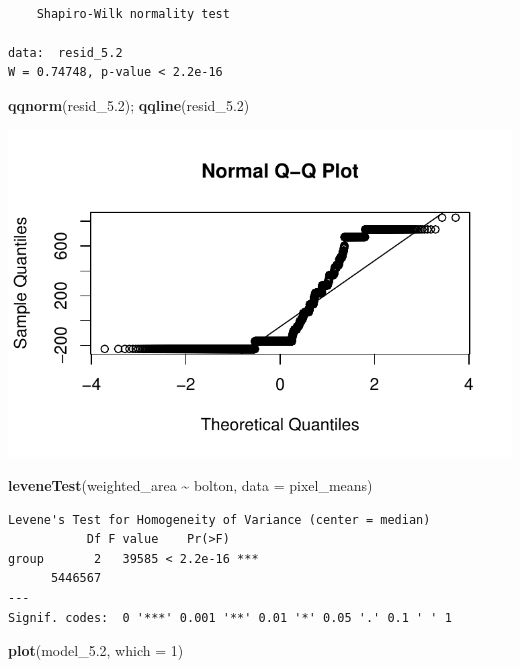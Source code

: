 \documentclass[
  british,
  10pt,
]{article}
\newenvironment{Shaded}{\begin{snugshade}}{\end{snugshade}}
\newcommand{\AttributeTok}[1]{\textcolor[rgb]{0.13,0.29,0.53}{#1}}
\newcommand{\DecValTok}[1]{\textcolor[rgb]{0.00,0.00,0.81}{#1}}
\newcommand{\FloatTok}[1]{\textcolor[rgb]{0.00,0.00,0.81}{#1}}
\newcommand{\FunctionTok}[1]{\textcolor[rgb]{0.13,0.29,0.53}{\textbf{#1}}}
\newcommand{\NormalTok}[1]{#1}
\newcommand{\SpecialCharTok}[1]{\textcolor[rgb]{0.81,0.36,0.00}{\textbf{#1}}}
\begin{document}
\begin{verbatim}

    Shapiro-Wilk normality test

data:  resid_5.2
W = 0.74748, p-value < 2.2e-16
\end{verbatim}

\begin{Shaded}
\begin{Highlighting}[]
\FunctionTok{qqnorm}\NormalTok{(resid\_5}\FloatTok{.2}\NormalTok{); }\FunctionTok{qqline}\NormalTok{(resid\_5}\FloatTok{.2}\NormalTok{)}
\end{Highlighting}
\end{Shaded}

\begin{center}
\includegraphics[width=0.6\linewidth,height=\textheight,keepaspectratio]{BCB744_Biostats_Prac_Exam_2025_files/figure-pdf/chunk18-1.pdf}
\end{center}

\begin{Shaded}
\begin{Highlighting}[]
\FunctionTok{leveneTest}\NormalTok{(weighted\_area }\SpecialCharTok{\textasciitilde{}}\NormalTok{ bolton, }\AttributeTok{data =}\NormalTok{ pixel\_means)}
\end{Highlighting}
\end{Shaded}

\begin{verbatim}
Levene's Test for Homogeneity of Variance (center = median)
           Df F value    Pr(>F)    
group       2   39585 < 2.2e-16 ***
      5446567                      
---
Signif. codes:  0 '***' 0.001 '**' 0.01 '*' 0.05 '.' 0.1 ' ' 1
\end{verbatim}

\begin{Shaded}
\begin{Highlighting}[]
\FunctionTok{plot}\NormalTok{(model\_5}\FloatTok{.2}\NormalTok{, }\AttributeTok{which =} \DecValTok{1}\NormalTok{)}
\end{Highlighting}
\end{Shaded}
\end{document}
